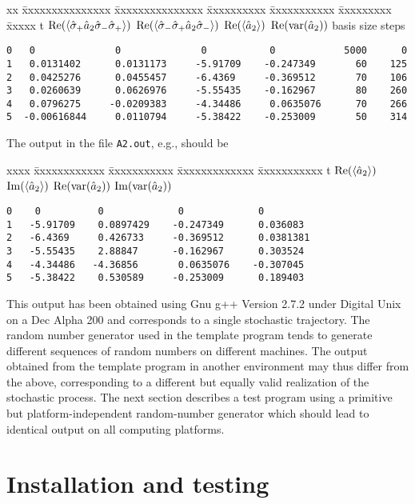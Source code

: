 \begin{tabbing}
xx \= xxxxxxxxxxxxxxx \= xxxxxxxxxxxxxxx \= xxxxxxxxxx \= 
xxxxxxxxxxx \= xxxxxxxxx \=  xxxxx \kill
t  \> ${\rm Re}(\langle \hat\sigma_+\hat a_2\hat\sigma_-\hat\sigma_+ \rangle)$ \>
${\rm Re}(\langle \hat\sigma_-\hat\sigma_+\hat a_2\hat\sigma_- \rangle)$ \>
${\rm Re}(\langle \hat a_2 \rangle)$ \>
${\rm Re}({\rm var}(\hat a_2))$ \>
basis size \> steps \\
\end{tabbing}
\begin{verbatim}
0   0              0              0           0            5000      0
1   0.0131402      0.0131173     -5.91709    -0.247349       60    125
2   0.0425276      0.0455457     -6.4369     -0.369512       70    106
3   0.0260639      0.0626976     -5.55435    -0.162967       80    260
4   0.0796275     -0.0209383     -4.34486     0.0635076      70    266
5  -0.00616844     0.0110794     -5.38422    -0.253009       50    314
\end{verbatim}
The output in the file {\tt A2.out}, e.g., should be
\begin{tabbing}
xxxx \= xxxxxxxxxxxx \= xxxxxxxxxxx \= xxxxxxxxxxxxx \= 
xxxxxxxxxxx \kill
t \>
${\rm Re}(\langle \hat a_2 \rangle)$ \>
${\rm Im}(\langle \hat a_2 \rangle)$ \>
${\rm Re}({\rm var}(\hat a_2))$ \>
${\rm Im}({\rm var}(\hat a_2))$ \\
\end{tabbing}
\begin{verbatim}
0    0          0             0             0
1   -5.91709    0.0897429    -0.247349      0.036083
2   -6.4369     0.426733     -0.369512      0.0381381
3   -5.55435    2.88847      -0.162967      0.303524
4   -4.34486   -4.36856       0.0635076    -0.307045
5   -5.38422    0.530589     -0.253009      0.189403
\end{verbatim}

This output has been obtained using Gnu g++ Version 2.7.2 under Digital Unix on
a Dec Alpha 200 and corresponds to a single stochastic trajectory. The random
number generator used in the template program tends to generate different
sequences of random numbers on different machines. The output obtained from the
template program in another environment may thus differ from the above,
corresponding to a different but equally valid realization of the stochastic
process. The next section describes a test program using a primitive but
platform-independent
random-number generator which should lead to identical output on all
computing platforms.


\section{Installation and testing}

